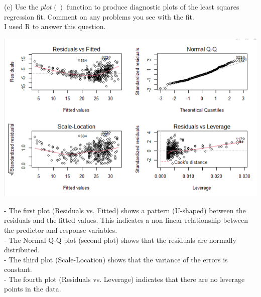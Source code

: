 \documentclass{article}
\begin{document}
(c) Use the $plot()$ function to produce diagnostic plots of the least squares regression fit. Comment on any problems you see with the fit. \\
\indent I used R to answer this question.
\begin{center}
\includegraphics[scale = 0.46]{3.8.c.png} \\
\end{center}
- The first plot (Residuals vs. Fitted) shows a pattern (U-shaped) between the residuals and the fitted values. This indicates a non-linear relationship between the predictor and response variables. \\
- The Normal Q-Q plot (second plot) shows that the residuals are normally distributed. \\
- The third plot (Scale-Location) shows that the variance of the errors is constant. \\
- The fourth plot (Residuals vs. Leverage) indicates that there are no leverage points in the data. %
\end{document}
